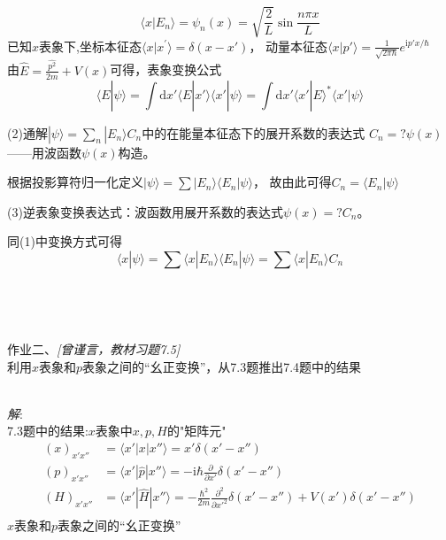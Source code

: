 \documentclass[a4paper]{article}
\newcommand{\qed}{
    \rightline{Q.E.D.}\\
    }
\begin{document}
\begin{CJK*}{UTF8}{song}
{    $$\langle x|E_{n}\rangle = \psi_{n}(x)=\sqrt{\frac{2}{L}}\sin{\frac{n\pi x}{L}}$$
    已知$x$表象下,坐标本征态$\langle x|x^{'}\rangle =\delta(x-x')$，
    动量本征态$\langle x|p'\rangle = \frac{1}{\sqrt{2\pi\hbar}}e^{\mathrm{i}p'x/\hbar}$\\
    由$\hat{E}=\frac{\hat{p^{2}}}{2 m}+V(x)$可得，表象变换公式
    $$\langle E|\psi\rangle=\int\mathrm{d}x'\langle E|x'\rangle\langle x'|\psi\rangle
        =\int\mathrm{d}x'\langle x'|E\rangle^{*}\langle x'|\psi\rangle$$
    \begin{CJK*}{UTF8}{kai}
    \noindent(2)通解$|\psi\rangle=\sum_{n}|E_{n}\rangle C_{n}$中的在能量本征态下的展开系数的表达式
        $C_{n}=?\psi(x)$——用波函数$\psi(x)$构造。\\
    \end{CJK*}
    根据投影算符归一化定义$|\psi\rangle=\sum|E_{n}\rangle\langle E_{n}|\psi\rangle$，
    故由此可得$C_{n}=\langle E_{n}|\psi\rangle$\\
    \begin{CJK*}{UTF8}{kai}
    (3)逆表象变换表达式：波函数用展开系数的表达式$\psi(x)=?  C_{n}$。
    \end{CJK*}
    同(1)中变换方式可得
    $$\langle x|\psi\rangle = \sum\langle x|E_{n}\rangle\langle E_{n}|\psi\rangle 
        = \sum\langle x|E_{n}\rangle C_{n}$$
    \qed
    }\\[20pt]
    \begin{CJK*}{UTF8}{hei}
    \noindent 作业二、\emph{[曾谨言，教材习题7.5]}\\
    利用$x$表象和$p$表象之间的“幺正变换”，从7.3题推出7.4题中的结果
    \end{CJK*}
    \\[12pt]
    {
    \noindent \emph{解}:\\
    7.3题中的结果:$x$表象中$x,p,H$的"矩阵元"
    \begin{equation*}\begin{split}
    (x)_{x'x''} & = \langle x'|x|x''\rangle = x'\delta(x'-x'')\\
    (p)_{x'x''} & = \langle x'|\hat{p}|x''\rangle 
        = -\mathrm{i}\hbar\frac{\partial}{\partial x'}\delta(x'-x'')\\
    (H)_{x'x''} & = \langle x'|\hat{H}|x''\rangle
        =-\frac{{\hbar}^{2}}{2 m}\frac{\partial^{2}}{\partial {x'}^{2}}\delta(x'-x'')
        +V(x')\delta(x'-x'')\\
    \end{split}\end{equation*}
    $x$表象和$p$表象之间的“幺正变换”
}
\end{CJK*}
\end{document}
